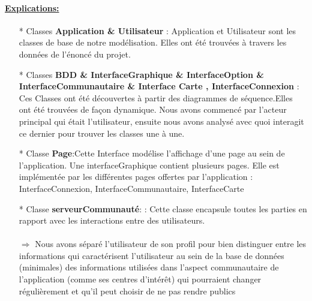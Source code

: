 \documentclass[12pt]{article}
\begin{document}
\paragraph{\ul{Explications:}}
\begin{itemize}
	\item[* ] Classes \textbf{Application \& Utilisateur} : Application et Utilisateur sont les classes de base de 
	notre modélisation. Elles ont été trouvées à travers les données de l’énoncé du projet.
	\item[* ] Classes \textbf{BDD \& InterfaceGraphique \& InterfaceOption \& \\ InterfaceCommunautaire \& Interface Carte , InterfaceConnexion} : Ces Classes ont été découvertes à partir des 
	diagrammes de séquence.Elles ont été trouvées de façon dynamique. Nous avons commencé 
	par l’acteur principal qui était l’utilisateur, ensuite nous avons analysé avec quoi interagit ce 
	dernier pour trouver les classes une à une.
	\item[* ] Classe \textbf{Page}:Cette Interface modélise l’affichage d’une page au sein de l’application. Une 
	interfaceGraphique contient plusieurs pages. Elle est implémentée par les différentes pages offertes par 
	l’application : InterfaceConnexion, InterfaceCommunautaire, InterfaceCarte
	\item[* ] Classe \textbf{serveurCommunauté}: : Cette classe encapsule toutes les parties en rapport avec les 
	interactions entre des utilisateurs. \\
	\\
	$\Rightarrow$ Nous avons séparé l’utilisateur de son profil pour bien distinguer entre les 
	informations qui caractérisent l’utilisateur au sein de la base de données (minimales) des 
	informations utilisées dans l’aspect communautaire de l’application (comme ses centres 
	d’intérêt) qui pourraient changer régulièrement et qu’il peut choisir de ne pas rendre publics
	
	
	
\end{itemize}
	
\end{document}
